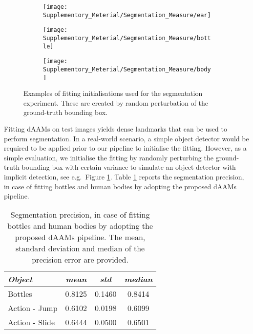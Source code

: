 \begin{figure}[!t]
    \centering
    \begin{subfigure}[b]{0.15\textwidth}
            \texttt{[image: Supplementory\_Meterial/Segmentation\_Measure/ear]}
    \end{subfigure}
    \begin{subfigure}[b]{0.15\textwidth}
            \texttt{[image: Supplementory\_Meterial/Segmentation\_Measure/bottle]}
    \end{subfigure}
    \begin{subfigure}[b]{0.15\textwidth}
            \texttt{[image: Supplementory\_Meterial/Segmentation\_Measure/body]}
    \end{subfigure}
    \caption{Examples of fitting initialisations used for the segmentation experiment. These are created by random perturbation of the ground-truth bounding box.}
    \label{fig:seg_init}
\end{figure}

Fitting dAAMs on test images yields dense landmarks that can be used to perform segmentation. In a real-world scenario, a simple object detector would be required to be applied prior to our pipeline to initialise the fitting. However, as a simple evaluation, we initialise the fitting by randomly perturbing the ground-truth bounding box with certain variance to simulate an object detector with implicit detection, see e.g.~Figure \ref{fig:seg_init}. Table  \ref{tab:seg_result} reports the segmentation precision, in case of fitting bottles and human bodies by adopting the proposed dAAMs pipeline.

\begin{table}[!h]
\small
\centering
\begin{tabular}{|l|c|c|c|}
\hline
\emph{Object}   & \emph{mean} & \emph{std} & \emph{median}\\
\hline\hline
Bottles         & 0.8125      & 0.1460     & 0.8414\\
Action - Jump   & 0.6102      & 0.0198     & 0.6099\\
Action - Slide  & 0.6444      & 0.0500     & 0.6501\\
\hline
\end{tabular}
\caption{Segmentation precision, in case of fitting bottles and human bodies by adopting the proposed dAAMs pipeline. The mean, standard deviation and median of the precision error are provided.}
\label{tab:seg_result}
\end{table}

% 
% 


